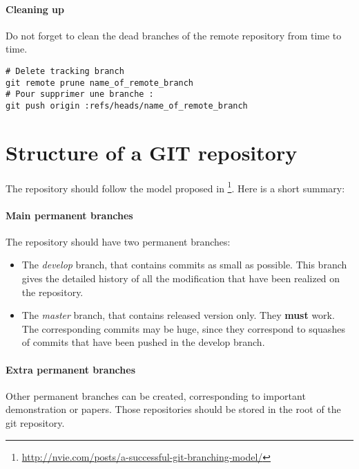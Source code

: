 \paragraph{Cleaning up}

Do not forget to clean the dead branches of the remote repository from time to time.
\begin{verbatim}
# Delete tracking branch
git remote prune name_of_remote_branch
# Pour supprimer une branche :
git push origin :refs/heads/name_of_remote_branch
\end{verbatim}


\section{Structure of a GIT repository}
The repository should follow the model proposed in \footnote{\url{http://nvie.com/posts/a-successful-git-branching-model/}}.
Here is a short summary:
\paragraph{Main permanent branches}
The repository should have two permanent branches:
\begin{itemize}
\item The \textit{develop} branch, that contains commits as small as possible. This branch gives the detailed history of all the modification that have been realized on the repository. 
\item The \textit{master} branch, that contains released version only. They \textbf{must} work. The corresponding commits may be huge, since they correspond to squashes of commits that have been pushed in the develop branch.
\end{itemize}

\paragraph{Extra permanent branches}
Other permanent branches can be created, corresponding to important demonstration or papers.
Those repositories should be stored in the root of the git repository.

